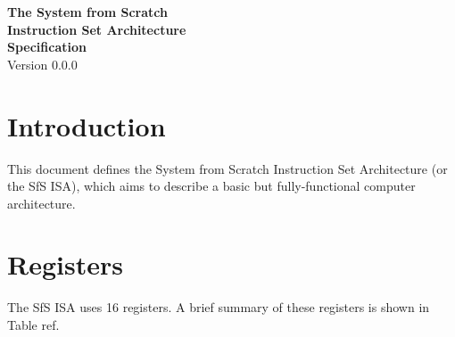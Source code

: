 

\usepackage{bytefield}

\newlength{\maxheight}

\newcommand{\baselinealign}[1]{\centering\raisebox{0pt}[\maxheight][0pt]{#1}}


\newcommand{\opdesc}[2]{\begin{opbox}{\tt sfsasm} Syntax: #1, RTL: #2\end{opbox}}


\vspace*{\fill}
\begin{flushright}
{\Huge\bf The System from Scratch\\Instruction Set Architecture\\Specification\\}
\vspace{2em}
{\Large Version 0.0.0}
\end{flushright}
\vspace*{\fill}
\pagebreak{}

\tableofcontents
\pagebreak{}

\section{Introduction}
This document defines the System from Scratch Instruction Set Architecture (or the SfS ISA), which aims to describe a basic but fully-functional computer architecture.

\section{Registers}
The SfS ISA uses 16 registers. A brief summary of these registers is shown in Table ref.

